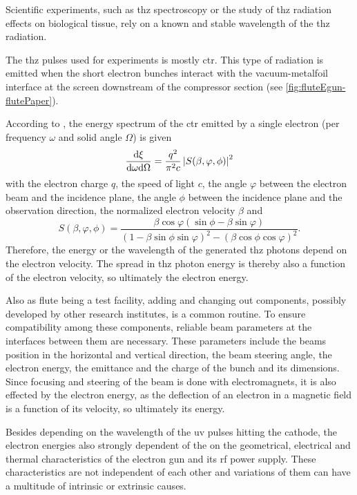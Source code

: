 Scientific experiments, such as \gls{thz} spectroscopy or the study of \gls{thz} radiation effects on biological tissue, rely on a known and stable wavelength of the \gls{thz} radiation. 

The \gls{thz} pulses used for experiments is mostly \gls{ctr}. This type of radiation is emitted when the short electron bunches interact with the vacuum-metalfoil interface at the screen downstream of the compressor section (see \autoref{fig:fluteEgun-flutePaper}). \cite{Yan:IPAC2016-WEPOY037,Thongbai2007}

According to \cite{ding2019coherent}, the energy spectrum of the \gls{ctr} emitted by a single electron (per frequency $\omega$ and solid angle $\Omega$) is given
\begin{equation}
\frac{\text{d}{\xi}}{\text{d}{\omega}\text{d}{\Omega}} = \frac{q^2}{\pi^2 c} \left|S(\beta,\varphi,\phi)\right|^2
\end{equation}
with the electron charge $q$, the speed of light $c$, the angle $\varphi$ between the electron beam and the incidence plane, the angle $\phi$ between the incidence plane and the observation direction, the normalized electron velocity $\beta$ and
\begin{equation}
S(\beta,\varphi,\phi) = \frac{\beta \cos \varphi (\sin \phi -\beta \sin \varphi)}{(1-\beta \sin \phi \sin \varphi)^2-(\beta \cos \phi \cos \varphi)^2}.
\end{equation}
Therefore, the energy or the wavelength of the generated \gls{thz} photons depend on the electron velocity. The spread in \gls{thz} photon energy is thereby also a function of the electron velocity, so ultimately the electron energy.

Also as \gls{flute} being a test facility, adding and changing out components, possibly developed by other research institutes, is a common routine. To ensure compatibility among these components, reliable beam parameters at the interfaces between them are necessary. These parameters include the beams position in the horizontal and vertical direction, the beam steering angle, the electron energy, the emittance and the charge of the bunch and its dimensions. Since focusing and steering of the beam is done with electromagnets, it is also effected by the electron energy, as the deflection of an electron in a magnetic field is a function of its velocity, so ultimately its energy.

Besides depending on the wavelength of the \gls{uv} pulses hitting the cathode, the electron energies also strongly dependent of the  on the geometrical, electrical and thermal characteristics of the electron gun and its \gls{rf} power supply. These characteristics are not independent of each other and variations of them can have a multitude of intrinsic or extrinsic causes.

